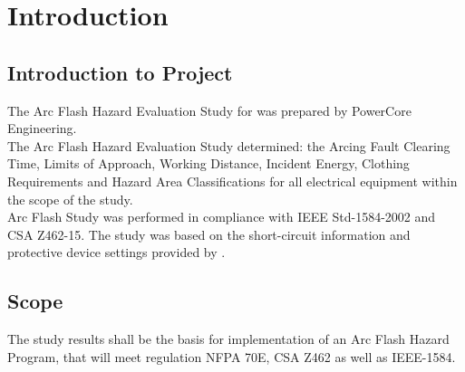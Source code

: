 
\section{Introduction}
\label{af:intro}

\subsection{Introduction to Project}
\label{af:intro:proj}

The Arc Flash Hazard Evaluation Study for \Customer{} was prepared by PowerCore Engineering.\\

The Arc Flash Hazard Evaluation Study determined: the Arcing Fault Clearing Time, Limits of Approach, Working Distance, Incident Energy, Clothing Requirements and Hazard Area Classifications for all electrical equipment within the scope of the study.\\

Arc Flash Study was performed in compliance with IEEE Std-1584-2002 and CSA Z462-15. The study was based on the short-circuit information and protective device settings provided by \Customer{}.

\subsection{Scope}
\label{af:intro:scope}

The study results shall be the basis for implementation of an Arc Flash Hazard Program, that will meet regulation NFPA 70E, CSA Z462 as well as IEEE-1584.\\




